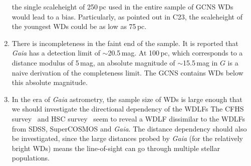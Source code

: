 \documentclass[fleqn,usenatbib]{mnras}
\begin{document}
\begin{enumerate}
    the single scaleheight of 250\,pc used in the entire sample of GCNS WDs
    would lead to a bias. Particularly, as pointed out in C23, the scaleheight
    of the youngest WDs could be as low as 75\,pc.
    \item There is incompleteness in the faint end of the sample. It is
    reported that \textit{Gaia} has a detection limit of $\sim$20.5\,mag.
    At 100\,pc, which corresponds to a distance modulus of 5\,mag, an absolute
    magnitude of $\sim$15.5\,mag in $G$ is a naive derivation of the
    completeness limit. The GCNS contains WDs below this absolute magnitude.
    \item In the era of \textit{Gaia} astrometry, the sample size of WDs is large
    enough that we should investigate the directional dependency of the WDLFs
    The CFHS survey~\citep{2019ApJ...887..148F} and HSC
    survey~\citep{2024MNRAS.535.3611Q} seem to reveal a WDLF dissimilar to the
    WDLFs from SDSS, SuperCOSMOS and \textit{Gaia}. The distance dependency
    should also be investigated, since the large distances probed by \textit{Gaia}
    (for the relatively bright WDs) means the line-of-sight can go through multiple
    stellar populations.
\end{enumerate}
\end{document}
